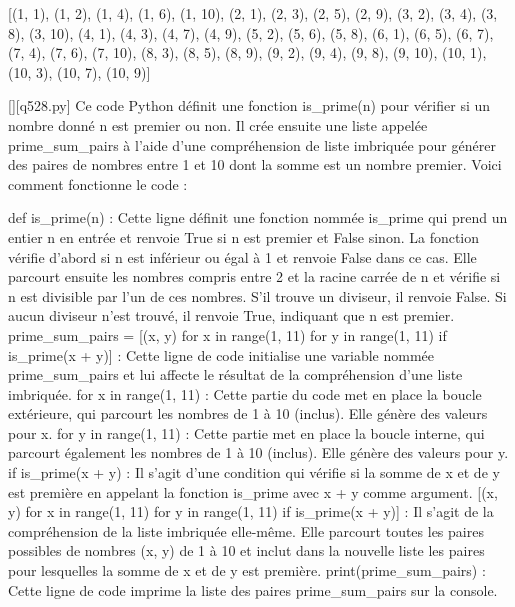 [(1, 1), (1, 2), (1, 4), (1, 6), (1, 10), (2, 1), (2, 3), (2, 5), (2, 9), (3, 2), (3, 4), (3, 8), (3, 10), (4, 1), (4, 3), (4, 7), (4, 9), (5, 2), (5, 6), (5, 8), (6, 1), (6, 5), (6, 7), (7, 4), (7, 6), (7, 10), (8, 3), (8, 5), (8, 9), (9, 2), (9, 4), (9, 8), (9, 10), (10, 1), (10, 3), (10, 7), (10, 9)]
        \par
        \begin{solution}
            \renewcommand{\nomfichier}{q528.py}
            \pythonfile{\chemincode \nomfichier}[][\nomfichier]
            Ce code Python définit une fonction is_prime(n) pour vérifier si un nombre donné n est premier ou non. Il crée ensuite une liste appelée prime_sum_pairs à l'aide d'une compréhension de liste imbriquée pour générer des paires de nombres entre 1 et 10 dont la somme est un nombre premier. Voici comment fonctionne le code :

    def is_prime(n) : Cette ligne définit une fonction nommée is_prime qui prend un entier n en entrée et renvoie True si n est premier et False sinon. La fonction vérifie d'abord si n est inférieur ou égal à 1 et renvoie False dans ce cas. Elle parcourt ensuite les nombres compris entre 2 et la racine carrée de n et vérifie si n est divisible par l'un de ces nombres. S'il trouve un diviseur, il renvoie False. Si aucun diviseur n'est trouvé, il renvoie True, indiquant que n est premier.
    prime_sum_pairs = [(x, y) for x in range(1, 11) for y in range(1, 11) if is_prime(x + y)] : Cette ligne de code initialise une variable nommée prime_sum_pairs et lui affecte le résultat de la compréhension d'une liste imbriquée.
        for x in range(1, 11) : Cette partie du code met en place la boucle extérieure, qui parcourt les nombres de 1 à 10 (inclus). Elle génère des valeurs pour x.
        for y in range(1, 11) : Cette partie met en place la boucle interne, qui parcourt également les nombres de 1 à 10 (inclus). Elle génère des valeurs pour y.
        if is_prime(x + y) : Il s'agit d'une condition qui vérifie si la somme de x et de y est première en appelant la fonction is_prime avec x + y comme argument.
        [(x, y) for x in range(1, 11) for y in range(1, 11) if is_prime(x + y)] : Il s'agit de la compréhension de la liste imbriquée elle-même. Elle parcourt toutes les paires possibles de nombres (x, y) de 1 à 10 et inclut dans la nouvelle liste les paires pour lesquelles la somme de x et de y est première.
    print(prime_sum_pairs) : Cette ligne de code imprime la liste des paires prime_sum_pairs sur la console.
        \end{solution}
        

